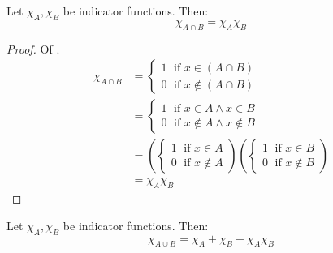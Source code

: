 \begin{thm}\label{thm-cap-indicator-function}
	Let $\chi_A,\chi_B$ be indicator functions. Then:
	\begin{equation*}
		\chi_{A \cap B} = \chi_A\chi_B
	\end{equation*}
\end{thm}

\begin{proof}
	Of .
	\begin{align*}
		\chi_{A \cap B} & = \begin{cases}
			1\;\text{ if } x \in (A \cap B) \\
			0\;\text{ if } x \notin (A \cap B)
		\end{cases}                                                     \\
		                & = \begin{cases}
			1\;\text{ if } x \in A \land x \in B \\
			0\;\text{ if } x \notin A \land x \notin B
		\end{cases}                                                     \\
		                & = \left(\begin{cases}
				1\;\text{ if } x \in A \\
				0\;\text{ if } x \notin A
			\end{cases}\right)\left(\begin{cases}
				1\;\text{ if } x \in B \\
				0\;\text{ if } x \notin B
			\end{cases}\right) \\
		                & = \chi_A\chi_B
	\end{align*}
\end{proof}

\begin{thm}\label{thm-cup-indicator-function}
	Let $\chi_A,\chi_B$ be indicator functions. Then:
	\begin{equation*}
		\chi_{A \cup B} = \chi_A + \chi_B - \chi_A\chi_B
	\end{equation*}
\end{thm}

